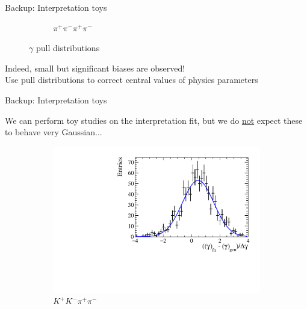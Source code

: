 \documentclass[xcolor={dvipsnames}]{beamer}
\begin{document}
\begin{frame}{Backup: Interpretation toys}
\begin{figure}
\begin{subfigure}{0.5\textwidth}
      \vspace{-0.3cm}
      \caption*{$\pi^+\pi^-\pi^+\pi^-$}
    \end{subfigure}
    \vspace{-0.5cm}
    \caption*{$\gamma$ pull distributions}
  \end{figure}
  \vspace{-0.3cm}
  \begin{center}
    Indeed, small but significant biases are observed!\\
    Use pull distributions to correct central values of physics parameters
  \end{center}
\end{frame}

\begin{frame}{Backup: Interpretation toys}
  \begin{center}
    We can perform toy studies on the interpretation fit, but we do \underline{not} expect these to behave very Gaussian...
  \end{center}
  \begin{figure}
    \centering
    \begin{subfigure}{0.5\textwidth}
      \centering
      \includegraphics[width=1.0\textwidth]{Plots/gamma_pull_toys_KKpipi.pdf}
      \vspace{-0.3cm}
      \caption*{$K^+K^-\pi^+\pi^-$}
    \end{subfigure}%
    \begin{subfigure}{0.5\textwidth}
      \centering

\end{subfigure}
\end{figure}
\end{frame}
\end{document}

